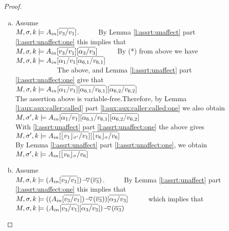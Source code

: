 \begin{proof}
\begin{enumerate}[a.]
\item
Assume  \\
  $\satDAssertFrom M  \sigma k   \Ain[\overline {v_3/v_1}] $. 
      \ \ \ \ \ By Lemma \ref{l:assrt:unaffect} part \ref{l:assrt:unaffect:one} this  implies that \\
$\satDAssertFrom M  \sigma k   \Ain[\overline {v_3/v_1}][\overline { {\alpha_3}/v_3 }] $   
      \ \ \ \ \ By (*) from above we have\\
$\satDAssertFrom M  \sigma k   \Ain[\overline  {\alpha_1 /v_1}  [\overline { \alpha_{6,1}/v_{6,1}}] $ \\    
$\strut \hspace{2cm}  $ The above, and   Lemma \ref{l:assrt:unaffect} part \ref{l:assrt:unaffect:one}  give that\\
$\satDAssertFrom M  \sigma k   \Ain[\overline { \alpha_1/v_1}]  [\overline { \alpha_{6,1}/v_{6,1}}]  [\overline { \alpha_{6,2}/v_{6,2}}]$ 
\\ The assertion above is variable-free.Therefore,  by Lemma \ref{l:aux:aux:caller:called} part \ref{l:aux:aux:caller:called:one} we also obtain\\ 
$\satDAssertFrom M   {\sigma'} k   {\Ain[\overline {\alpha_1/v_1}]  [\overline { \alpha_{6,1}/v_{6,1}}]  [\overline { \alpha_{6,2}/v_{6,2}}]}$ \\
With  \ref{l:assrt:unaffect} part \ref{l:assrt:unaffect:one} the above gives \\
$\satDAssertFrom M  {\sigma'}  k  { \Ain[\overline{  \interpret {\sigma'} {v_1}/v_1}]  [\overline {  \interpret {\sigma} {v_6}/v_6 }]}$\\
 By Lemma \ref{l:assrt:unaffect} part \ref{l:assrt:unaffect:one}, we obtain \\
$\satDAssertFrom M   {\sigma'}  k  { \Ain   [\overline {  \interpret {\sigma} {v_6}/v_6 }]}$
\item
Assume\\
$ \satDAssertFrom M  \sigma k    {\PushASLong  {(\overline {v_3})} {(\Ain[\overline {v_3/v_1}])}}$. 
 \ \ \ \ \ By Lemma \ref{l:assrt:unaffect} part \ref{l:assrt:unaffect:one} this  implies that \\
 $ \satDAssertFrom M  \sigma k    {(\PushASLong  {(\overline {v_3})} {(\Ain[\overline {v_3/v_1} ])}) [\overline { {\alpha_3}/v_3 }] }$
 \ \ \ \ \ which implies that\\
$ \satDAssertFrom M  \sigma k   { \PushASLong  {(\overline {\alpha_3})} {(\Ain[\overline {v_3/v_1} ][\overline { {\alpha_3}/v_3 }]) }  }$

\end{enumerate}
\end{proof}
